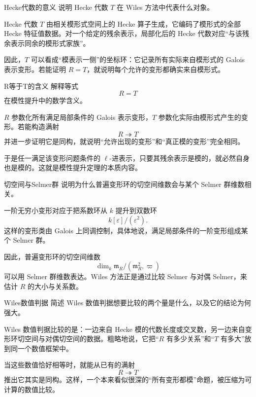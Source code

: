 \begin{problem}{Hecke代数的意义}
\medium
说明 Hecke 代数 $T$ 在 Wiles 方法中代表什么对象。
\end{problem}
\begin{solution}
Hecke 代数 $T$ 由相关模形式空间上的 Hecke 算子生成，它编码了模形式的全部 Hecke 特征值数据。对一个给定的残余表示，局部化后的 Hecke 代数对应“与该残余表示同余的模形式家族”。

因此，$T$ 可以看成“模表示一侧”的坐标环：它记录所有实际来自模形式的 Galois 表示变形。若能证明 $R=T$，就说明每个允许的变形都确实来自模形式。
\end{solution}

\begin{problem}{R等于T的含义}
\medium
解释等式
\[
R=T
\]
在模性提升中的数学含义。
\end{problem}
\begin{solution}
$R$ 参数化所有满足局部条件的 Galois 表示变形，$T$ 参数化实际由模形式产生的变形。若能构造满射
\[
R\twoheadrightarrow T
\]
并进一步证明它是同构，就说明“允许出现的变形”和“真正模的变形”完全相同。

于是任一满足该变形问题条件的 $\ell$-进表示，只要其残余表示是模的，就必然自身也是模的。这就是模性提升定理的本质内容。
\end{solution}

\begin{problem}{切空间与Selmer群}
\medium
说明为什么普遍变形环的切空间维数会与某个 Selmer 群维数相关。
\end{problem}
\begin{solution}
一阶无穷小变形对应于把系数环从 $k$ 提升到双数环
\[
k[\varepsilon]/(\varepsilon^2).
\]
这样的变形类由 Galois 上同调控制，具体地说，满足局部条件的一阶变形组成某个 Selmer 群。

因此，普遍变形环的切空间维数
\[
\dim_k \mathfrak m_R/(\mathfrak m_R^2,\varpi)
\]
可以用 Selmer 群维数表达。Wiles 方法正是通过比较 Selmer 与对偶 Selmer，来估计 $R$ 的大小与关系数。
\end{solution}

\begin{problem}{Wiles数值判据}
\medium
简述 Wiles 数值判据想要比较的两个量是什么，以及它的结论为何强大。
\end{problem}
\begin{solution}
Wiles 数值判据比较的是：一边来自 Hecke 模的代数长度或交叉数，另一边来自变形环切空间与对偶切空间的数据。粗略地说，它把“$R$ 有多少关系”和“$T$ 有多大”放到同一个数值框架中。

当这些数值恰好相等时，就能从已有的满射
\[
R\twoheadrightarrow T
\]
推出它其实是同构。这样，一个本来看似很深的“所有变形都模”命题，被压缩为可计算的数值比较。
\end{solution}


